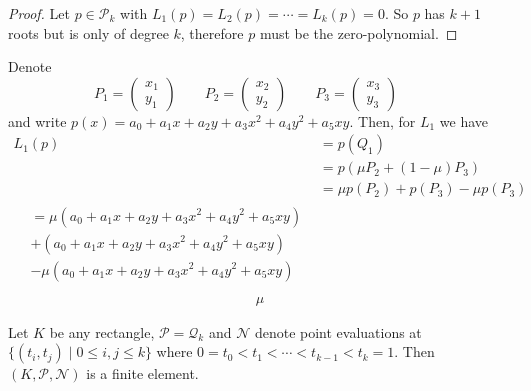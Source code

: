 \begin{proof}
    Let \(p \in \mathcal{P}_k\) with \(L_1 (p) = L_2 (p) = \cdots = L_k (p) = 0\). So \(p\) has \(k + 1\) roots but is only of degree \(k\), therefore \(p\) must be the zero-polynomial.
\end{proof}

\begin{example}
    Denote
    \begin{equation}
        P_1 = \begin{pmatrix}
            x_1 \\ y_1
        \end{pmatrix} \qquad
        P_2 = \begin{pmatrix}
            x_2 \\ y_2
        \end{pmatrix} \qquad
        P_3 = \begin{pmatrix}
            x_3 \\ y_3
        \end{pmatrix} \qquad
    \end{equation}
    and write \(p(x) = a_0 + a_1 x + a_2 y + a_3 x^2 + a_4 y^2 + a_5 xy\). Then, for \(L_1\) we have
    \begin{align}
        L_1 (p) &= p(Q_1) \\
        &= p(\mu P_2 + (1 - \mu)P_3) \\
        &= \mu p (P_2) + p (P_3) - \mu p (P_3) \\
        \begin{split}
            &= \mu \left( a_0 + a_1 x + a_2 y + a_3 x^2 + a_4 y^2 + a_5 xy \right) \\
            & + \left( a_0 + a_1 x + a_2 y + a_3 x^2 + a_4 y^2 + a_5 xy \right) \\
            & - \mu \left( a_0 + a_1 x + a_2 y + a_3 x^2 + a_4 y^2 + a_5 xy \right) \\
        \end{split}
    \end{align}
    \begin{align}
        \mu
    \end{align}
\end{example}

\begin{example}
    Let \(K\) be any rectangle, \(\mathcal{P} = \mathcal{Q}_k\) and \(\mathcal{N}\) denote point evaluations at \(\{(t_i, t_j) \mid 0 \leq i, j \leq k\}\) where \(0 = t_0 < t_1 < \cdots < t_{k-1} < t_k = 1\). Then \((K, \mathcal{P}, \mathcal{N})\) is a finite element.
\end{example}